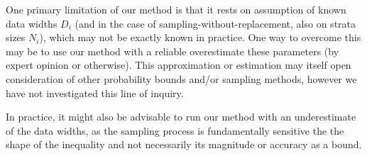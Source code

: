 % 


%


One primary limitation of our method is that it rests on assumption of known data widths $D_i$ (and in the case of sampling-without-replacement, also on strata sizes $N_i$), which may not be exactly known in practice.
One way to overcome this may be to use our method with a reliable overestimate these parameters (by expert opinion or otherwise). This approximation or estimation may itself open consideration of other probability bounds and/or sampling methods, however we have not investigated this line of inquiry. 

In practice, it might also be advisable to run our method with an underestimate of the data widths, as the sampling process is fundamentally sensitive the the shape of the inequality and not necessarily its magnitude or accuracy as a bound.



